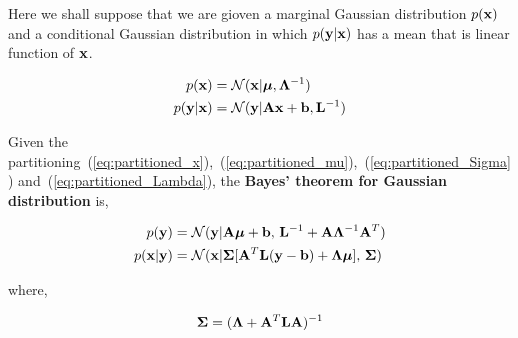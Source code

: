 
Here we shall suppose that we are gioven a marginal Gaussian distribution $p(\mathbf{x})$ and a conditional Gaussian distribution in which $p(\mathbf{y}|\mathbf{x})$ has a mean that is linear function of $\mathbf{x}$.

\begin{align}
    p(\mathbf{x}) &=  \mathcal{N}(\mathbf{x}|\bm{\mu},\bm{\Lambda}^{-1}) \\
   p(\mathbf{y}|\mathbf{x}) &=  \mathcal{N}(\mathbf{y}|\mathbf{A}\mathbf{x}+\mathbf{b},\mathbf{L}^{-1})    
\end{align}

\begin{framed}

 Given the partitioning~(\ref{eq:partitioned_x}),~(\ref{eq:partitioned_mu}),~(\ref{eq:partitioned_Sigma}) and~(\ref{eq:partitioned_Lambda}), the \textbf{Bayes' theorem for Gaussian distribution} is, 

 
\begin{align}
    p(\mathbf{y}) &=  \mathcal{N}(\mathbf{y}|\mathbf{A}\bm{\mu}+\mathbf{b},\, \mathbf{L}^{-1} + \mathbf{A}\mathbf{\Lambda}^{-1}\mathbf{A}^T) \\
   p(\mathbf{x}|\mathbf{y}) &=  \mathcal{N}(\mathbf{x}|\mathbf{\Sigma}[\mathbf{A}^T \mathbf{L}(\mathbf{y}-\mathbf{b})+ \bm{\Lambda\mu}],\,  \mathbf{\Sigma})\label{eq:post}
\end{align}

where, 

\begin{equation}
 \mathbf{\Sigma} = (\mathbf{\Lambda} + \mathbf{A}^T \mathbf{LA} )^{-1}
\end{equation}


\end{framed}





